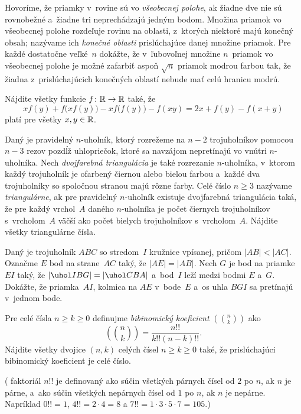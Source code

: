 {%
Hovoríme, že priamky v~rovine sú vo {\it všeobecnej polohe}, ak žiadne dve nie sú rovnobežné a~žiadne tri neprechádzajú jedným bodom. Množina priamok vo všeobecnej polohe rozdeľuje rovinu na oblasti, z~ktorých niektoré majú konečný obsah; nazývame ich {\it konečné oblasti\/} prislúchajúce danej množine priamok. Pre každé dostatočne veľké~$n$ dokážte, že v~ľubovoľnej množine $n$~priamok vo všeobecnej polohe je možné zafarbiť aspoň $\sqrt{n}$
priamok modrou farbou tak, že žiadna z~prislúchajúcich konečných oblastí nebude mať celú hranicu modrú.}

{%
Nájdite všetky funkcie $f\colon\Bbb R\to\Bbb R$ také, že
$$
xf(y)+f\bigl(xf(y)\bigr)-xf\bigl(f(y)\bigr)-f(xy)=2x+f(y)-f(x+y)
$$
platí pre všetky $x,y\in\Bbb R$.}

{%
Daný je pravidelný $n$-uholník, ktorý rozrežeme na $n-2$ trojuholníkov pomocou $n-3$ rezov pozdĺž uhlopriečok, ktoré sa navzájom nepretínajú vo vnútri $n$-uholníka. Nech {\it dvojfarebná triangulácia\/} je také rozrezanie $n$-uholníka, v~ktorom každý trojuholník je ofarbený čiernou alebo bielou farbou a~každé dva trojuholníky so spoločnou stranou majú rôzne farby. Celé číslo $n\ge 3$ nazývame {\it triangulárne}, ak pre pravidelný $n$-uholník existuje dvojfarebná triangulácia taká, že pre každý vrchol~$A$ daného $n$-uholníka je počet čiernych trojuholníkov s~vrcholom~$A$ väčší ako počet bielych trojuholníkov s~vrcholom~$A$. Nájdite všetky triangulárne čísla.
}

{%
Daný je trojuholník $ABC$ so stredom~$I$ kružnice vpísanej, pričom $|AB|<|AC|$. Označme $E$ bod na strane~$AC$ taký, že $|AE|=|AB|$. Nech $G$ je bod na priamke~$EI$ taký, že $|\uhol IBG|=|\uhol CBA|$ a~bod~$I$ leží medzi bodmi $E$ a~$G$.
Dokážte, že priamka~$AI$, kolmica na $AE$ v~bode~$E$ a~os uhla $BGI$ sa pretínajú v~jednom bode.
}

{%
Pre celé čísla $n\ge k\ge 0$ definujme {\it bibinomický koeficient\/} $\displaystyle\left(\!\!\binom{n}{k}\!\!\right)$ ako
$$
\left(\!\!\binom{n}{k}\!\!\right)=\frac{n!!}{k!!(n-k)!!}.
$$
Nájdite všetky dvojice $(n,k)$ celých čísel $n\ge k\ge 0$ také, že prislúchajúci bibinomický koeficient je celé číslo.

( faktoriál $n!!$ je definovaný ako súčin všetkých párnych čísel od $2$ po $n$, ak $n$ je párne, a~ako súčin všetkých nepárnych čísel od $1$ po $n$, ak $n$ je nepárne. Napríklad $0!!=1$, $4!!=2\cdot4=8$ a $7!!=1\cdot3\cdot5\cdot7=105$.)
}

